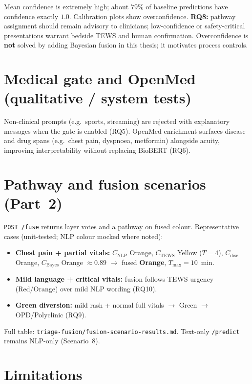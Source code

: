 Mean confidence is extremely high; about \(79\%\) of baseline predictions have confidence exactly \(1.0\). Calibration plots show overconfidence. \textbf{RQ8:} pathway assignment should remain advisory to clinicians; low-confidence or safety-critical presentations warrant bedside TEWS and human confirmation. Overconfidence is \textbf{not} solved by adding Bayesian fusion in this thesis; it motivates process controls.

\section{Medical gate and OpenMed (qualitative / system tests)}

Non-clinical prompts (e.g.\ sports, streaming) are rejected with explanatory messages when the gate is enabled (RQ5). OpenMed enrichment surfaces disease and drug spans (e.g.\ chest pain, dyspnoea, metformin) alongside acuity, improving interpretability without replacing BioBERT (RQ6).

\section{Pathway and fusion scenarios (Part~2)}

\texttt{POST /fuse} returns layer votes and a pathway on fused colour. Representative cases (unit-tested; NLP colour mocked where noted):

\begin{itemize}
  \item \textbf{Chest pain + partial vitals:} \(C_{\mathrm{NLP}}\) Orange, \(C_{\mathrm{TEWS}}\) Yellow (\(T=4\)), \(C_{\mathrm{disc}}\) Orange, \(C_{\mathrm{Bayes}}\) Orange \(\approx 0.89\) \(\to\) fused \textbf{Orange}, \(T_{\max}=10\)~min.
  \item \textbf{Mild language + critical vitals:} fusion follows TEWS urgency (Red/Orange) over mild NLP wording (RQ10).
  \item \textbf{Green diversion:} mild rash + normal full vitals \(\to\) Green \(\to\) OPD/Polyclinic (RQ9).
\end{itemize}

Full table: \texttt{triage-fusion/fusion-scenario-results.md}. Text-only \texttt{/predict} remains NLP-only (Scenario~8).

\section{Limitations}

